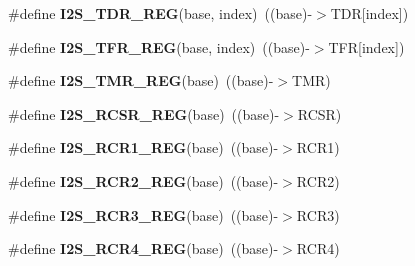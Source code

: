 \begin{DoxyCompactItemize}
\item 
\#define {\bfseries I2\+S\+\_\+\+T\+D\+R\+\_\+\+R\+EG}(base,  index)~((base)-\/$>$T\+DR\mbox{[}index\mbox{]})\hypertarget{group__I2S__Register__Accessor__Macros_ga0c6906e2715aabf27a2eb2a42af14527}{}\label{group__I2S__Register__Accessor__Macros_ga0c6906e2715aabf27a2eb2a42af14527}

\item 
\#define {\bfseries I2\+S\+\_\+\+T\+F\+R\+\_\+\+R\+EG}(base,  index)~((base)-\/$>$T\+FR\mbox{[}index\mbox{]})\hypertarget{group__I2S__Register__Accessor__Macros_gae0f97e86f9a784060d1e9b01fe5c49b8}{}\label{group__I2S__Register__Accessor__Macros_gae0f97e86f9a784060d1e9b01fe5c49b8}

\item 
\#define {\bfseries I2\+S\+\_\+\+T\+M\+R\+\_\+\+R\+EG}(base)~((base)-\/$>$T\+MR)\hypertarget{group__I2S__Register__Accessor__Macros_ga69469ef04acc4f7702d0bf79c541bbca}{}\label{group__I2S__Register__Accessor__Macros_ga69469ef04acc4f7702d0bf79c541bbca}

\item 
\#define {\bfseries I2\+S\+\_\+\+R\+C\+S\+R\+\_\+\+R\+EG}(base)~((base)-\/$>$R\+C\+SR)\hypertarget{group__I2S__Register__Accessor__Macros_ga41969cdffb776b0b7f133fb2702b76c8}{}\label{group__I2S__Register__Accessor__Macros_ga41969cdffb776b0b7f133fb2702b76c8}

\item 
\#define {\bfseries I2\+S\+\_\+\+R\+C\+R1\+\_\+\+R\+EG}(base)~((base)-\/$>$R\+C\+R1)\hypertarget{group__I2S__Register__Accessor__Macros_ga0e72a70cec83128fe927cc42e499767e}{}\label{group__I2S__Register__Accessor__Macros_ga0e72a70cec83128fe927cc42e499767e}

\item 
\#define {\bfseries I2\+S\+\_\+\+R\+C\+R2\+\_\+\+R\+EG}(base)~((base)-\/$>$R\+C\+R2)\hypertarget{group__I2S__Register__Accessor__Macros_ga06fb6f3ab6761f72068561455d6f707c}{}\label{group__I2S__Register__Accessor__Macros_ga06fb6f3ab6761f72068561455d6f707c}

\item 
\#define {\bfseries I2\+S\+\_\+\+R\+C\+R3\+\_\+\+R\+EG}(base)~((base)-\/$>$R\+C\+R3)\hypertarget{group__I2S__Register__Accessor__Macros_gae7aecac6ac09bbe0118385b34ad8ff65}{}\label{group__I2S__Register__Accessor__Macros_gae7aecac6ac09bbe0118385b34ad8ff65}

\item 
\#define {\bfseries I2\+S\+\_\+\+R\+C\+R4\+\_\+\+R\+EG}(base)~((base)-\/$>$R\+C\+R4)\hypertarget{group__I2S__Register__Accessor__Macros_gae7d96a14af22052e8f9bb55da75351ec}{}\label{group__I2S__Register__Accessor__Macros_gae7d96a14af22052e8f9bb55da75351ec}


\end{DoxyCompactItemize}
